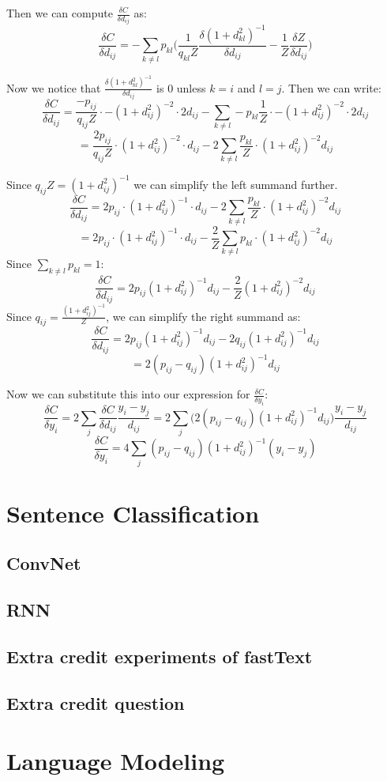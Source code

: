 \documentclass[a4paper]{article}
\begin{document}
\begin{enumerate}
{Then we can compute $\frac{ \delta C }{\delta d_{ij} }$ as:
$$\frac{ \delta C }{\delta d_{ij} } = - \sum_{k \neq l} p_{kl} \Big( \frac{1}{q_{kl} Z }  \frac{\delta (1+d_{kl}^2)^{-1}  }{\delta d_{ij}} - \frac{1}{Z} \frac{\delta Z }{\delta d_{ij}} \Big) $$

Now we notice that $\frac{\delta (1+d_{kl}^2)^{-1} }{\delta d_{ij}}$ is $0$ unless $k=i$ and $l=j$. Then we can write:
$$\frac{ \delta C }{\delta d_{ij} } =  \frac{ - p_{ij} }{q_{ij} Z } \cdot -  (1+d_{ij}^2)^{-2} \cdot 2 d_{ij} - \sum_{k \neq l} - p_{kl} \frac{1}{Z} \cdot -(1 + d_{ij}^2)^{-2} \cdot 2 d_{ij}$$
$$ =  \frac{  2 p_{ij} }{q_{ij} Z } \cdot (1+d_{ij}^2)^{-2} \cdot d_{ij} - 2 \sum_{k \neq l}  \frac{ p_{kl}}{Z} \cdot (1 + d_{ij}^2)^{-2} d_{ij} $$

Since $q_{ij} Z = (1+d_{ij}^2)^{-1}$ we can simplify the left summand further.
$$\frac{ \delta C }{\delta d_{ij} }  =   2 p_{ij} \cdot (1+d_{ij}^2)^{-1} \cdot d_{ij} - 2 \sum_{k \neq l}  \frac{ p_{kl}}{Z} \cdot (1 + d_{ij}^2)^{-2} d_{ij} $$
$$ =   2 p_{ij} \cdot (1+d_{ij}^2)^{-1} \cdot d_{ij} - \frac{2}{Z} \sum_{k \neq l}  p_{kl} \cdot (1 + d_{ij}^2)^{-2} d_{ij} $$
Since $\sum_{k \neq l} p_{kl} = 1$:
$$\frac{ \delta C }{\delta d_{ij} }  =   2 p_{ij}  (1+d_{ij}^2)^{-1}  d_{ij} - \frac{2}{Z} (1 + d_{ij}^2)^{-2} d_{ij} $$
Since $q_{ij} = \frac{(1+d_{ij}^2)^{-1} }{  Z }$, we can simplify the right summand as:
$$\frac{ \delta C }{\delta d_{ij} }  =   2 p_{ij}  (1+d_{ij}^2)^{-1}  d_{ij} - 2 q_{ij} (1 + d_{ij}^2)^{-1} d_{ij} $$
$$ = 2 (p_{ij} - q_{ij}) (1+d_{ij}^2)^{-1}  d_{ij} $$

Now we can substitute this into our expression for $\frac{\delta C }{\delta y_i}$:
$$\frac{\delta C }{\delta y_i} = 2 \sum_j  \frac{\delta C }{\delta d_{ij}}  \frac{y_i - y_j}{ d_{ij} } = 2 \sum_j  \Big( 2 (p_{ij} - q_{ij}) (1+d_{ij}^2)^{-1}  d_{ij}  \Big) \frac{y_i - y_j}{ d_{ij} }$$
$$\frac{\delta C }{\delta y_i}  = 4 \sum_j  (p_{ij} - q_{ij}) (1+d_{ij}^2)^{-1} (y_i - y_j)$$

}
\end{enumerate}

\section{Sentence Classification}

\subsection{ConvNet}

\subsection{RNN}

\subsection{Extra credit experiments of fastText}

\subsection{Extra credit question}

\section{Language Modeling}
\end{document}
